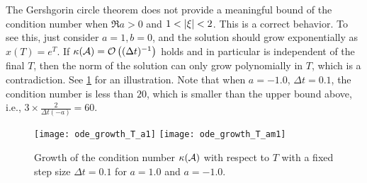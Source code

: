 \begin{exam}
The Gershgorin circle theorem does not provide a meaningful bound of the condition number when $\Re a>0$ and $1<\left\lvert\xi\right\rvert<2$. 
This is a correct behavior.
To see this, just consider $a=1,b=0$, and the solution should grow exponentially as $x(T)=e^{T}$. 
If $\kappa(\mathcal{A})=\mathcal{O}\left((\Delta t) ^{-1}\right)$ holds and in particular is independent of the final $T$, then the norm of the solution can only grow polynomially in $T$, which is a contradiction. See \cref{fig:ode_growth_T} for an illustration. Note that when $a=-1.0$, $\Delta t=0.1$, the condition number is less than $20$, which is smaller than the upper bound above, i.e.,
$3\times\frac{2}{\Delta t (-a)}=60$. 

\begin{figure}[H]
\begin{center}
\texttt{[image: ode\_growth\_T\_a1]}
\texttt{[image: ode\_growth\_T\_am1]}
\end{center}
\caption{Growth of the condition number $\kappa(\mathcal{A})$ with respect to $T$ with a fixed step size $\Delta t=0.1$ for $a=1.0$ and $a=-1.0$.}
\label{fig:ode_growth_T}
\end{figure}
\end{exam}


